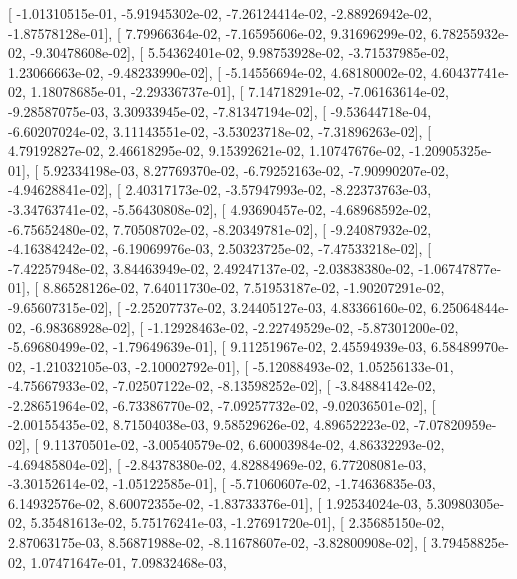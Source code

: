 \documentclass{article}
\begin{document}
       [ -1.01310515e-01,  -5.91945302e-02,  -7.26124414e-02,
         -2.88926942e-02,  -1.87578128e-01],
       [  7.79966364e-02,  -7.16595606e-02,   9.31696299e-02,
          6.78255932e-02,  -9.30478608e-02],
       [  5.54362401e-02,   9.98753928e-02,  -3.71537985e-02,
          1.23066663e-02,  -9.48233990e-02],
       [ -5.14556694e-02,   4.68180002e-02,   4.60437741e-02,
          1.18078685e-01,  -2.29336737e-01],
       [  7.14718291e-02,  -7.06163614e-02,  -9.28587075e-03,
          3.30933945e-02,  -7.81347194e-02],
       [ -9.53644718e-04,  -6.60207024e-02,   3.11143551e-02,
         -3.53023718e-02,  -7.31896263e-02],
       [  4.79192827e-02,   2.46618295e-02,   9.15392621e-02,
          1.10747676e-02,  -1.20905325e-01],
       [  5.92334198e-03,   8.27769370e-02,  -6.79252163e-02,
         -7.90990207e-02,  -4.94628841e-02],
       [  2.40317173e-02,  -3.57947993e-02,  -8.22373763e-03,
         -3.34763741e-02,  -5.56430808e-02],
       [  4.93690457e-02,  -4.68968592e-02,  -6.75652480e-02,
          7.70508702e-02,  -8.20349781e-02],
       [ -9.24087932e-02,  -4.16384242e-02,  -6.19069976e-03,
          2.50323725e-02,  -7.47533218e-02],
       [ -7.42257948e-02,   3.84463949e-02,   2.49247137e-02,
         -2.03838380e-02,  -1.06747877e-01],
       [  8.86528126e-02,   7.64011730e-02,   7.51953187e-02,
         -1.90207291e-02,  -9.65607315e-02],
       [ -2.25207737e-02,   3.24405127e-03,   4.83366160e-02,
          6.25064844e-02,  -6.98368928e-02],
       [ -1.12928463e-02,  -2.22749529e-02,  -5.87301200e-02,
         -5.69680499e-02,  -1.79649639e-01],
       [  9.11251967e-02,   2.45594939e-03,   6.58489970e-02,
         -1.21032105e-03,  -2.10002792e-01],
       [ -5.12088493e-02,   1.05256133e-01,  -4.75667933e-02,
         -7.02507122e-02,  -8.13598252e-02],
       [ -3.84884142e-02,  -2.28651964e-02,  -6.73386770e-02,
         -7.09257732e-02,  -9.02036501e-02],
       [ -2.00155435e-02,   8.71504038e-03,   9.58529626e-02,
          4.89652223e-02,  -7.07820959e-02],
       [  9.11370501e-02,  -3.00540579e-02,   6.60003984e-02,
          4.86332293e-02,  -4.69485804e-02],
       [ -2.84378380e-02,   4.82884969e-02,   6.77208081e-03,
         -3.30152614e-02,  -1.05122585e-01],
       [ -5.71060607e-02,  -1.74636835e-03,   6.14932576e-02,
          8.60072355e-02,  -1.83733376e-01],
       [  1.92534024e-03,   5.30980305e-02,   5.35481613e-02,
          5.75176241e-03,  -1.27691720e-01],
       [  2.35685150e-02,   2.87063175e-03,   8.56871988e-02,
         -8.11678607e-02,  -3.82800908e-02],
       [  3.79458825e-02,   1.07471647e-01,   7.09832468e-03,
\end{document}
